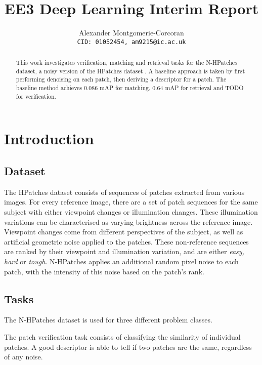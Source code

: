 \documentclass[10pt,twocolumn,letterpaper]{article}
\begin{document}
\title{EE3 Deep Learning Interim Report}

\author{Alexander Montgomerie-Corcoran\\
{\tt\small CID: 01052454, am9215@ic.ac.uk}
}

\maketitle

\begin{abstract}
   This work investigates verification, matching and retrieval tasks for the N-HPatches dataset, a noisy version of the HPatches dataset \cite{hpatches_2017_cvpr}.
   A baseline approach is taken by first performing denoising on each patch, then deriving a descriptor for a patch. The baseline method achieves 0.086 mAP for matching, 0.64 mAP for retrieval and TODO for verification.
\end{abstract}

\section{Introduction}
\subsection{Dataset}
The HPatches dataset consists of sequences of patches extracted from various images. For every reference image, there are a set of patch sequences for the same subject with either viewpoint changes or illumination changes. These illumination variations can be characterised as varying brightness across the reference image. Viewpoint changes come from different perspectives of the subject, as well as artificial geometric noise applied to the patches. These non-reference sequences are ranked by their viewpoint and illumination variation, and are either \textit{easy, hard} or \textit{tough}. N-HPatches applies an additional random pixel noise to each patch, with the intensity of this noise based on the patch's rank.

\subsection{Tasks}
The N-HPatches dataset is used for three different problem classes. 

The patch verification task consists of classifying the similarity of individual patches. A good descriptor is able to tell if two patches are the same, regardless of any noise.
\end{document}
